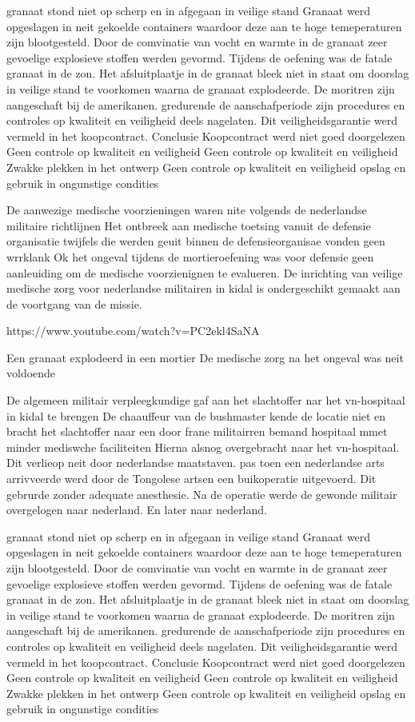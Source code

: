 granaat stond niet op scherp en in afgegaan in veilige stand
Granaat werd opgeslagen in neit gekoelde containers waardoor deze aan te hoge temeperaturen zijn blootgesteld.
Door de comvinatie van vocht en warmte in de granaat zeer gevoelige explosieve stoffen werden gevormd.
Tijdens de oefening was de fatale granaat in de zon.
Het afsluitplaatje in de granaat bleek niet in staat om doorslag in veilige stand te voorkomen waarna de granaat explodeerde.
De moritren zijn aangeschaft bij de amerikanen. gredurende de aanschafperiode zijn procedures en controles op kwaliteit en veiligheid deels nagelaten.
Dit veiligheidsgarantie werd vermeld in het koopcontract.
Conclusie
Koopcontract werd niet goed doorgelezen
Geen controle op kwaliteit en veiligheid
Geen controle op kwaliteit en veiligheid
Zwakke plekken in het ontwerp
Geen controle op kwaliteit en veiligheid
opslag en gebruik in ongunstige condities

De aanwezige medische voorzieningen waren nite volgends de nederlandse militaire richtlijnen
Het ontbreek aan medische toetsing vanuit de defensie organisatie
twijfels die werden geuit binnen de defensieorganisae vonden geen wrrklank
Ok het ongeval tijdens de mortieroefening was voor defensie geen aanleuiding om de medische voorzienignen te evalueren.
De inrichting van veilige medische zorg voor nederlandse militairen in kidal is ondergeschikt gemaakt aan de voortgang van de missie.


https://www.youtube.com/watch?v=PC2ekl4SaNA 


Een granaat explodeerd in een mortier
De medische zorg na het ongeval was neit voldoende


De algemeen militair verpleegkundige gaf aan het slachtoffer nar het vn-hospitaal in kidal te brengen
De chaauffeur van de bushmaster kende de locatie niet  en bracht het slachtoffer naar een door frane militairren bemand hospitaal mmet minder mediswche faciliteiten
Hierna alsnog overgebracht naar het vn-hospitaal.
Dit verlieop  neit door nederlandse maatstaven.
pas toen een nederlandse arts arrivveerde werd door de Tongolese artsen een buikoperatie uitgevoerd.
Dit gebrurde zonder adequate anesthesie.
Na de operatie werde de gewonde militair overgelogen naar nederland. En later naar nederland.


granaat stond niet op scherp en in afgegaan in veilige stand
Granaat werd opgeslagen in neit gekoelde containers waardoor deze aan te hoge temeperaturen zijn blootgesteld.
Door de comvinatie van vocht en warmte in de granaat zeer gevoelige explosieve stoffen werden gevormd.
Tijdens de oefening was de fatale granaat in de zon.
Het afsluitplaatje in de granaat bleek niet in staat om doorslag in veilige stand te voorkomen waarna de granaat explodeerde.
De moritren zijn aangeschaft bij de amerikanen. gredurende de aanschafperiode zijn procedures en controles op kwaliteit en veiligheid deels nagelaten.
Dit veiligheidsgarantie werd vermeld in het koopcontract.
Conclusie
Koopcontract werd niet goed doorgelezen
Geen controle op kwaliteit en veiligheid
Geen controle op kwaliteit en veiligheid
Zwakke plekken in het ontwerp
Geen controle op kwaliteit en veiligheid
opslag en gebruik in ongunstige condities

